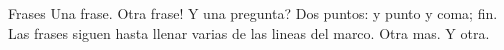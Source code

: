 \documentclass{beamer}
\begin{document}
\begin{frame}{Frases}
Una frase. Otra frase! Y una pregunta? Dos puntos: y punto y coma; fin. Las frases siguen hasta llenar varias de las lineas del marco. Otra mas. Y otra.
\end{frame}
\end{document}
